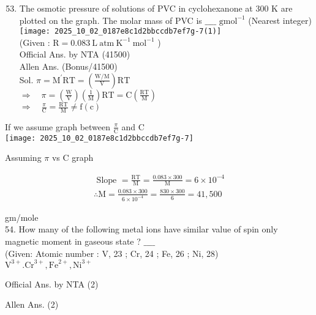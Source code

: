 \documentclass[10pt]{article}
\begin{document}
\begin{enumerate}
  \setcounter{enumi}{52}
  \item The osmotic pressure of solutions of PVC in cyclohexanone at 300 K are plotted on the graph. The molar mass of PVC is \(\_\_\_\_\) \(\mathrm{g} \mathrm{mol}^{-1}\) (Nearest integer)\\
\texttt{[image: 2025\_10\_02\_0187e8c1d2bbccdb7ef7g-7(1)]}\\
(Given : \(\mathrm{R}=0.083 \mathrm{~L} \mathrm{~atm} \mathrm{~K}^{-1} \mathrm{~mol}^{-1}\) )\\
Official Ans. by NTA (41500)\\
Allen Ans. (Bonus/41500)\\
Sol. \(\pi=\mathrm{M}^{\prime} \mathrm{RT}=\left(\frac{\mathrm{W} / \mathrm{M}}{\mathrm{V}}\right) \mathrm{RT}\)\\
\(\Rightarrow \quad \pi=\left(\frac{\mathrm{W}}{\mathrm{V}}\right)\left(\frac{1}{\mathrm{M}}\right) \mathrm{RT}=\mathrm{C}\left(\frac{\mathrm{RT}}{\mathrm{M}}\right)\)\\
\(\Rightarrow \quad \frac{\pi}{\mathrm{C}}=\frac{\mathrm{RT}}{\mathrm{M}} \neq \mathrm{f}(\mathrm{c})\)
\end{enumerate}

If we assume graph between \(\frac{\pi}{\mathrm{C}}\) and C\\
\texttt{[image: 2025\_10\_02\_0187e8c1d2bbccdb7ef7g-7]}

Assuming \(\pi\) vs C graph

\[
\begin{gathered}
\text { Slope }=\frac{\mathrm{RT}}{\mathrm{M}}=\frac{0.083 \times 300}{\mathrm{M}}=6 \times 10^{-4} \\
\therefore \mathrm{M}=\frac{0.083 \times 300}{6 \times 10^{-4}}=\frac{830 \times 300}{6}=41,500
\end{gathered}
\]

gm/mole\\
54. How many of the following metal ions have similar value of spin only magnetic moment in gaseous state ? \(\_\_\_\_\)\\
(Given: Atomic number : V, 23 ; Cr, 24 ; Fe, 26 ; Ni, 28)\\
\(\mathrm{V}^{3+} . \mathrm{Cr}^{3+}, \mathrm{Fe}^{2+}, \mathrm{Ni}^{3+}\)

Official Ans. by NTA (2)

Allen Ans. (2)
\end{document}
